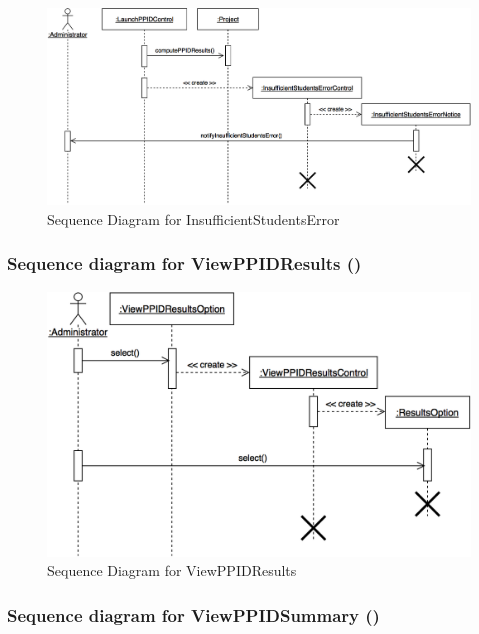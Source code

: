 \documentclass[12pt,letterpaper]{article}
\begin{document}
\begin{figure}[H]
	\centering{}
	\includegraphics[scale=0.3]{imgs/seq/insufficient-students-error.png}
	\caption{Sequence Diagram for InsufficientStudentsError}
\end{figure}

\subsubsection*{Sequence diagram for ViewPPIDResults (\viewppidresults{})}

\begin{figure}[H]
	\centering{}
	\includegraphics[scale=0.3]{imgs/seq/view-ppid-results.png}
	\caption{Sequence Diagram for ViewPPIDResults}
\end{figure}

\subsubsection*{Sequence diagram for ViewPPIDSummary (\viewppidsummary{})}
\end{document}
